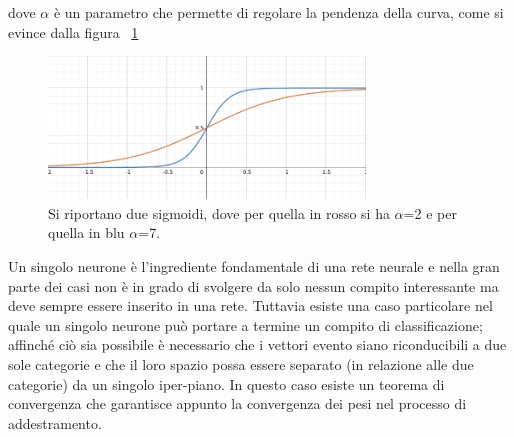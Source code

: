 dove $\alpha$ è un parametro che permette di regolare la pendenza della curva, come si evince dalla figura ~\ref{sigmoide}
\begin{figure}[h!]
	\centering
	\includegraphics[width=0.75\textwidth]{figs/sigmoide.png}
	\caption{Si riportano due sigmoidi, dove per quella in rosso si ha $\alpha$=2 e per quella in blu $\alpha$=7.}
	\label{sigmoide}
\end{figure}
\newpage
Un singolo neurone è l'ingrediente fondamentale di una rete neurale e nella gran parte dei casi non è in grado di svolgere da solo nessun compito interessante ma deve sempre essere inserito in una rete. Tuttavia esiste una caso particolare nel quale un singolo neurone può portare a termine un compito di classificazione; affinché ciò sia possibile è necessario che i vettori evento siano riconducibili a due sole categorie e che il loro spazio possa essere separato (in relazione alle due categorie) da un singolo iper-piano. In questo caso esiste un teorema di convergenza che garantisce appunto la convergenza dei pesi nel processo di addestramento.

